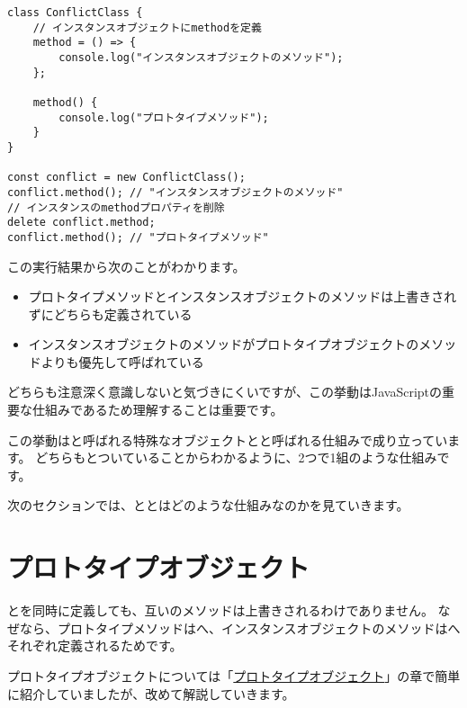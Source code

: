 \begin{lstlisting}
class ConflictClass {
    // インスタンスオブジェクトにmethodを定義
    method = () => {
        console.log("インスタンスオブジェクトのメソッド");
    };

    method() {
        console.log("プロトタイプメソッド");
    }
}

const conflict = new ConflictClass();
conflict.method(); // "インスタンスオブジェクトのメソッド"
// インスタンスのmethodプロパティを削除
delete conflict.method;
conflict.method(); // "プロトタイプメソッド"
\end{lstlisting}

この実行結果から次のことがわかります。
\newpage
\begin{itemize}
\item
  プロトタイプメソッドとインスタンスオブジェクトのメソッドは上書きされずにどちらも定義されている
\item
  インスタンスオブジェクトのメソッドがプロトタイプオブジェクトのメソッドよりも優先して呼ばれている
\end{itemize}

どちらも注意深く意識しないと気づきにくいですが、この挙動はJavaScriptの重要な仕組みであるため理解することは重要です。

この挙動は\textbf{}と呼ばれる特殊なオブジェクトと\textbf{}と呼ばれる仕組みで成り立っています。
どちらも\textbf{}とついていることからわかるように、2つで1組のような仕組みです。

次のセクションでは、\textbf{}と\textbf{}とはどのような仕組みなのかを見ていきます。

\hypertarget{prototype}{%
\section{プロトタイプオブジェクト}\label{prototype}}

\textbf{}と\textbf{}を同時に定義しても、互いのメソッドは上書きされるわけでありません。
なぜなら、プロトタイプメソッドは\textbf{}へ、インスタンスオブジェクトのメソッドは\textbf{}へそれぞれ定義されるためです。

プロトタイプオブジェクトについては「\hyperlink{prototype-object}{プロトタイプオブジェクト}」の章で簡単に紹介していましたが、改めて解説していきます。

